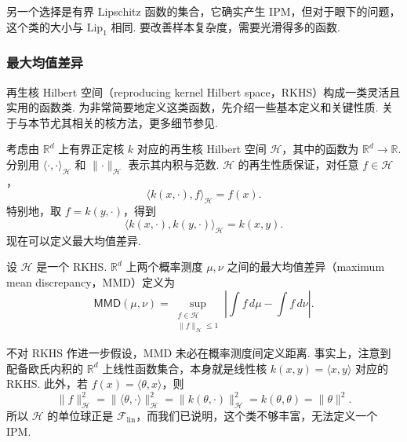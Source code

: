 另一个选择是有界 Lipschitz 函数的集合，它确实产生 IPM，但对于眼下的问题，这个类的大小与 $\mathrm{Lip}_1$ 相同. 要改善样本复杂度，需要光滑得多的函数.

\subsubsection{最大均值差异}\label{sec:2.8.2}
再生核 Hilbert 空间（reproducing kernel Hilbert space，RKHS）构成一类灵活且实用的函数类. 为非常简要地定义这类函数，先介绍一些基本定义和关键性质. 关于与本节尤其相关的核方法，更多细节参见\cite{ref232}.

考虑由 $\mathbb R^d$ 上有界正定核 $k$ 对应的再生核 Hilbert 空间 $\mathcal H$，其中的函数为 $\mathbb R^d\to\mathbb R$. 分别用 $\langle\cdot,\cdot\rangle_{\mathcal H}$ 和 $\lVert\cdot\rVert_{\mathcal H}$ 表示其内积与范数. $\mathcal H$ 的再生性质保证，对任意 $f\in\mathcal H$，
$$\langle k(x,\cdot),f\rangle_{\mathcal H}=f(x).$$
特别地，取 $f=k(y,\cdot)$，得到
$$\langle k(x,\cdot),k(y,\cdot)\rangle_{\mathcal H}=k(x,y).$$
现在可以定义最大均值差异.
\begin{definition}\label{def:2.20}
设 $\mathcal H$ 是一个 RKHS. $\mathbb R^d$ 上两个概率测度 $\mu,\nu$ 之间的最大均值差异（maximum mean discrepancy，MMD）定义为
$$\mathsf{MMD}(\mu,\nu)=\sup_{\substack{f\in\mathcal H\\\lVert f\rVert_{\mathcal H}\le1}}\left|\int f\,d\mu-\int f\,d\nu\right|.$$
\end{definition}
不对 RKHS 作进一步假设，MMD 未必在概率测度间定义距离. 事实上，注意到配备欧氏内积的 $\mathbb R^d$ 上线性函数集合，本身就是线性核 $k(x,y)=\langle x,y\rangle$ 对应的 RKHS. 此外，若 $f(x)=\langle\theta,x\rangle$，则
$$\lVert f\rVert_{\mathcal H}^2
=\lVert\langle\theta,\cdot\rangle\rVert_{\mathcal H}^2
=\lVert k(\theta,\cdot)\rVert_{\mathcal H}^2
=k(\theta,\theta)=\lVert\theta\rVert^2.$$
所以 $\mathcal H$ 的单位球正是 $\mathcal F_{\mathrm{lin}}$，而我们已说明，这个类不够丰富，无法定义一个 IPM.

